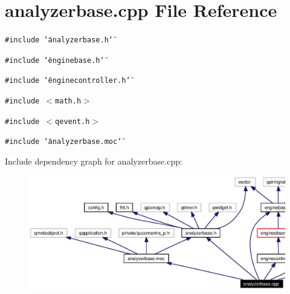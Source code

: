 \section{analyzerbase.cpp File Reference}
\label{analyzerbase_8cpp}


{\tt \#include \char`\"{}analyzerbase.h\char`\"{}}\par
{\tt \#include \char`\"{}enginebase.h\char`\"{}}\par
{\tt \#include \char`\"{}enginecontroller.h\char`\"{}}\par
{\tt \#include $<$math.h$>$}\par
{\tt \#include $<$qevent.h$>$}\par
{\tt \#include \char`\"{}analyzerbase.moc\char`\"{}}\par


Include dependency graph for analyzerbase.cpp:\begin{figure}[H]
\begin{center}
\leavevmode
\includegraphics[width=382pt]{analyzerbase_8cpp__incl}
\end{center}
\end{figure}
